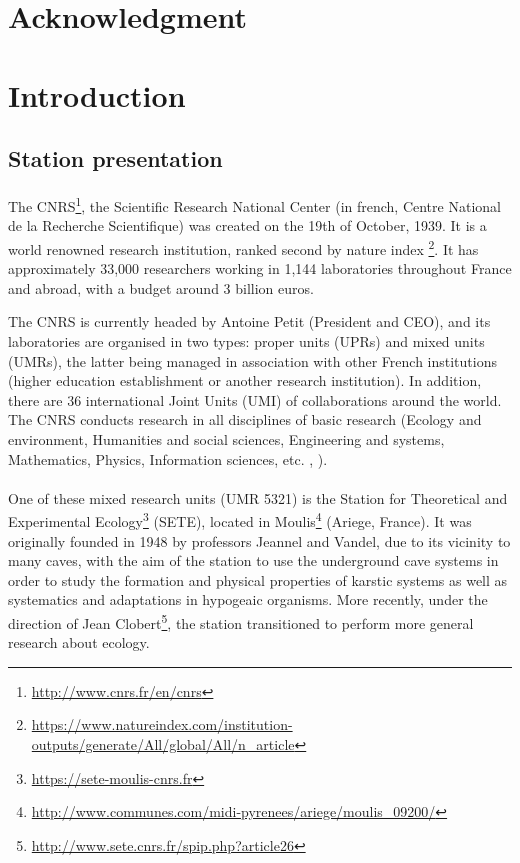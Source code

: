 \documentclass{article}
\begin{document}
\newpage
\section*{Acknowledgment}



\newpage
\section*{Introduction}

\subsection*{Station presentation}

\paragraph{}
The CNRS\footnote{\url{http://www.cnrs.fr/en/cnrs}}, the Scientific Research National Center (in french, Centre National de la Recherche Scientifique) was created on the 19th of October, 1939. It is a world renowned research institution, ranked second by  nature index \footnote{\url{https://www.natureindex.com/institution-outputs/generate/All/global/All/n_article}}. It has approximately 33,000 researchers working in 1,144 laboratories throughout France and abroad, with a budget around 3 billion euros. 

The CNRS is currently headed by Antoine Petit (President and CEO), and its laboratories are organised in two types: proper units (UPRs) and mixed units (UMRs), the latter being managed in association with other French institutions (higher education establishment or another research institution). In addition, there are 36 international Joint Units (UMI) of collaborations around the world. The CNRS conducts research in all disciplines of basic research (Ecology and environment, Humanities and social sciences, Engineering and systems, Mathematics, Physics, Information sciences, etc. , ).


\paragraph{}
One of these mixed research units (UMR 5321) is the Station for Theoretical and Experimental Ecology\footnote{\url{https://sete-moulis-cnrs.fr}} (SETE), located in Moulis\footnote{\url{http://www.communes.com/midi-pyrenees/ariege/moulis_09200/}} (Ariege, France). It was originally founded in 1948 by professors Jeannel and Vandel, due to its vicinity to many caves, with the aim of the station to use the underground cave systems in order to study the formation and physical properties of karstic systems as well as systematics and adaptations in hypogeaic organisms. More recently, under the direction of Jean Clobert\footnote{\url{http://www.sete.cnrs.fr/spip.php?article26}}, the station transitioned to perform more general research about ecology.
\end{document}
